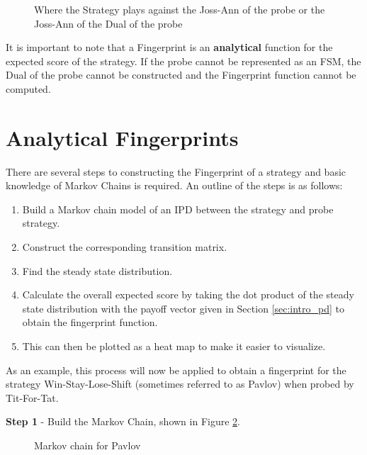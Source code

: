 \begin{figure}[!hbtp]
    \begin{center}
        
        \caption{Where the Strategy plays against the Joss-Ann of the probe or the Joss-Ann of the Dual of the probe}\label{fig:DualProbe}
    \end{center}
\end{figure}

It is important to note that a Fingerprint is an \textbf{analytical} function for the expected score of the strategy.
If the probe cannot be represented as an FSM, the Dual of the probe cannot be constructed and the Fingerprint function cannot be computed.



\section{Analytical Fingerprints}\label{sec:analytical-fingerprints}

There are several steps to constructing the Fingerprint of a strategy and basic knowledge of Markov Chains is required.
An outline of the steps is as follows:

\begin{enumerate}
    \item Build a Markov chain model of an IPD between the strategy and probe strategy.
    \item Construct the corresponding transition matrix.
    \item Find the steady state distribution.
    \item Calculate the overall expected score by taking the dot product of the steady state distribution with the payoff vector given in Section \ref{sec:intro_pd} to obtain the fingerprint function.
    \item This can then be plotted as a heat map to make it easier to visualize.
\end{enumerate}

As an example, this process will now be applied to obtain a fingerprint for the strategy Win-Stay-Lose-Shift (sometimes referred to as Pavlov) when probed by Tit-For-Tat.

\textbf{Step 1} - Build the Markov Chain, shown in Figure \ref{fig:PavlovMC}.

\begin{figure}[ht!]
\centering

\caption{Markov chain for Pavlov}
\label{fig:PavlovMC}
\end{figure}

